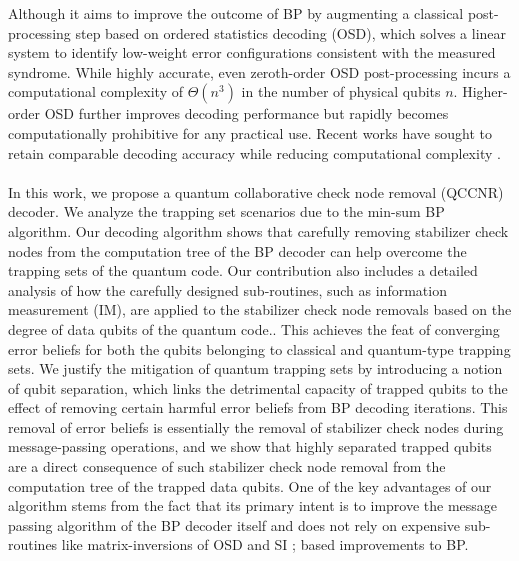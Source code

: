 \documentclass[%
 reprint,
 amsmath,amssymb,
 aps,
pra,
showkeys,
]{revtex4-2}
\begin{document}
Although it aims to improve the outcome of BP by augmenting a classical post-processing step based on ordered statistics decoding (OSD), which solves a linear system to identify low-weight error configurations consistent with the measured syndrome. 
While highly accurate, even zeroth-order OSD post-processing incurs a computational complexity of $\Theta(n^3)$ in the number of physical qubits $n$. 
Higher-order OSD further improves decoding performance but rapidly becomes computationally prohibitive for any practical use. 
Recent works have sought to retain comparable decoding accuracy while reducing computational complexity \cite{hillmann2025localized,wolanski2024ambiguity}.\\\\
In this work, we propose a quantum collaborative check node removal (QCCNR) decoder.
We analyze the trapping set scenarios due to the min-sum BP algorithm.
Our decoding algorithm shows that carefully removing stabilizer check nodes from the computation tree of the BP decoder can help overcome the trapping sets of the quantum code.
Our contribution also includes a detailed analysis of how the carefully designed sub-routines, such as information measurement (IM), are applied to the stabilizer check node removals based on the degree of data qubits of the quantum code..
This achieves the feat of converging error beliefs for both the qubits belonging to classical and quantum-type trapping sets.
We justify the mitigation of quantum trapping sets by introducing a notion of qubit separation, which links the detrimental capacity of trapped qubits to the effect of removing certain harmful error beliefs from BP decoding iterations.
This removal of error beliefs is essentially the removal of stabilizer check nodes during message-passing operations, and we show that highly separated trapped qubits are a direct consequence of such stabilizer check node removal from the computation tree of the trapped data qubits.
One of the key advantages of our algorithm stems from the fact that its primary intent is to improve the message passing algorithm of the BP decoder itself and does not rely on expensive sub-routines like matrix-inversions of OSD \cite{panteleev2021degenerate} and SI \cite{du2022stabilizer}; based improvements to BP.\\\\
\end{document}
